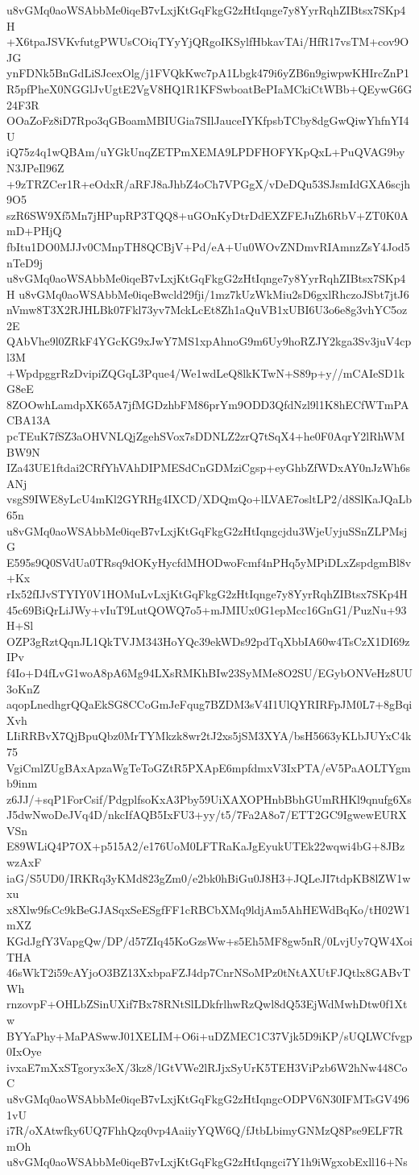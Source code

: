 u8vGMq0aoWSAbbMe0iqeB7vLxjKtGqFkgG2zHtIqnge7y8YyrRqhZIBtsx7SKp4H
+X6tpaJSVKvfutgPWUsCOiqTYyYjQRgoIKSylfHbkavTAi/HfR17vsTM+cov9OJG
ynFDNk5BnGdLiSJcexOlg/j1FVQkKwc7pA1Lbgk479i6yZB6n9giwpwKHIrcZnP1
R5pfPheX0NGGlJvUgtE2VgV8HQ1R1KFSwboatBePIaMCkiCtWBb+QEywG6G24F3R
OOaZoFz8iD7Rpo3qGBoamMBIUGia7SIlJauceIYKfpsbTCby8dgGwQiwYhfnYI4U
iQ75z4q1wQBAm/uYGkUnqZETPmXEMA9LPDFHOFYKpQxL+PuQVAG9byN3JPeIl96Z
+9zTRZCer1R+eOdxR/aRFJ8aJhbZ4oCh7VPGgX/vDeDQu53SJsmIdGXA6scjh9O5
szR6SW9Xf5Mn7jHPupRP3TQQ8+uGOnKyDtrDdEXZFEJuZh6RbV+ZT0K0AmD+PHjQ
fbItu1DO0MJJv0CMnpTH8QCBjV+Pd/eA+Uu0WOvZNDmvRIAmnzZsY4Jod5nTeD9j
u8vGMq0aoWSAbbMe0iqeB7vLxjKtGqFkgG2zHtIqnge7y8YyrRqhZIBtsx7SKp4H
u8vGMq0aoWSAbbMe0iqeBwcld29fji/1mz7kUzWkMiu2sD6gxlRhczoJSbt7jtJ6
nVmw8T3X2RJHLBk07Fkl73yv7MckLcEt8Zh1aQuVB1xUBI6U3o6e8g3vhYC5oz2E
QAbVhe9l0ZRkF4YGcKG9xJwY7MS1xpAhnoG9m6Uy9hoRZJY2kga3Sv3juV4cpl3M
+WpdpggrRzDvipiZQGqL3Pque4/We1wdLeQ8lkKTwN+S89p+y//mCAIeSD1kG8eE
8ZOOwhLamdpXK65A7jfMGDzhbFM86prYm9ODD3QfdNzl9l1K8hECfWTmPACBA13A
pcTEuK7fSZ3aOHVNLQjZgehSVox7sDDNLZ2zrQ7tSqX4+he0F0AqrY2lRhWMBW9N
IZa43UE1ftdai2CRfYhVAhDIPMESdCnGDMziCgsp+eyGhbZfWDxAY0nJzWh6sANj
vsgS9IWE8yLcU4mKl2GYRHg4IXCD/XDQmQo+lLVAE7osltLP2/d8SlKaJQaLb65n
u8vGMq0aoWSAbbMe0iqeB7vLxjKtGqFkgG2zHtIqngcjdu3WjeUyjuSSnZLPMsjG
E595s9Q0SVdUa0TRsq9dOKyHycfdMHODwoFcmf4nPHq5yMPiDLxZspdgmBl8v+Kx
rIx52fIJvSTYIY0V1HOMuLvLxjKtGqFkgG2zHtIqnge7y8YyrRqhZIBtsx7SKp4H
45c69BiQrLiJWy+vIuT9LutQOWQ7o5+mJMIUx0G1epMcc16GnG1/PuzNu+93H+Sl
OZP3gRztQqnJL1QkTVJM343HoYQc39ekWDs92pdTqXbbIA60w4TsCzX1DI69zIPv
f4Io+D4fLvG1woA8pA6Mg94LXsRMKhBIw23SyMMe8O2SU/EGybONVeHz8UU3oKnZ
aqopLnedhgrQQaEkSG8CCoGmJeFqug7BZDM3sV4I1UlQYRIRFpJM0L7+8gBqiXvh
LIiRRBvX7QjBpuQbz0MrTYMkzk8wr2tJ2xs5jSM3XYA/bsH5663yKLbJUYxC4k75
VgiCmlZUgBAxApzaWgTeToGZtR5PXApE6mpfdmxV3IxPTA/eV5PaAOLTYgmb9inm
z6JJ/+sqP1ForCsif/PdgplfsoKxA3Pby59UiXAXOPHnbBbhGUmRHKl9qnufg6Xs
J5dwNwoDeJVq4D/nkcIfAQB5IxFU3+yy/t5/7Fa2A8o7/ETT2GC9IgwewEURXVSn
E89WLiQ4P7OX+p515A2/e176UoM0LFTRaKaJgEyukUTEk22wqwi4bG+8JBzwzAxF
iaG/S5UD0/IRKRq3yKMd823gZm0/e2bk0hBiGu0J8H3+JQLeJI7tdpKB8lZW1wxu
x8Xlw9fsCc9kBeGJASqxSeESgfFF1cRBCbXMq9ldjAm5AhHEWdBqKo/tH02W1mXZ
KGdJgfY3VapgQw/DP/d57ZIq45KoGzsWw+s5Eh5MF8gw5nR/0LvjUy7QW4XoiTHA
46sWkT2i59cAYjoO3BZ13XxbpaFZJ4dp7CnrNSoMPz0tNtAXUtFJQtlx8GABvTWh
rnzovpF+OHLbZSinUXif7Bx78RNtSlLDkfrlhwRzQwl8dQ53EjWdMwhDtw0f1Xtw
BYYaPhy+MaPASwwJ01XELIM+O6i+uDZMEC1C37Vjk5D9iKP/sUQLWCfvgp0IxOye
ivxaE7mXxSTgoryx3eX/3kz8/lGtVWe2lRJjxSyUrK5TEH3ViPzb6W2hNw448CoC
u8vGMq0aoWSAbbMe0iqeB7vLxjKtGqFkgG2zHtIqngcODPV6N30IFMTsGV4961vU
i7R/oXAtwfky6UQ7FhhQzq0vp4AaiiyYQW6Q/fJtbLbimyGNMzQ8Pse9ELF7RmOh
u8vGMq0aoWSAbbMe0iqeB7vLxjKtGqFkgG2zHtIqngci7Y1h9iWgxobExll16+Ns
